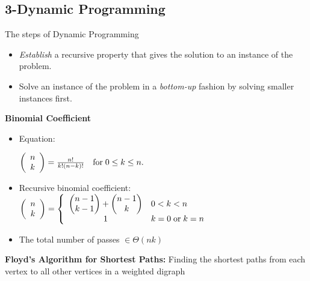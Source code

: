 \documentclass{../cheat}
\begin{document}
\begin{multicols}{3}
	
\section{3-Dynamic Programming}
	The steps of Dynamic Programming
		\begin{itemize}[nolistsep, leftmargin=1em]
		\item \textit{Establish} a recursive property that gives the solution to an instance of the problem. 
		\item Solve an instance of the problem in a \textit{bottom-up} fashion by solving smaller instances first. 
	\end{itemize}	
	
	 \textbf{Binomial Coefficient}
	 \begin{itemize}
	 	\item Equation: \\ \centerline{
			$\left( {\begin{array}{*{20}c} n \\ k \\ \end{array}} \right)=
			\frac{n!}{k!(n-k)!} \quad \text{for}\; 0 \leq k \leq n.$}
		\item Recursive binomial coefficient:\\
			$ \left( {\begin{array}{*{20}c} n \\ k \\ \end{array}} \right)=
			\left\{ \begin{array}{c l}
				\begin{pmatrix}n-1 \\ k-1 \end{pmatrix}+\begin{pmatrix}n-1 \\ k \end{pmatrix} & 0<k<n\\
				1 & k=0 \; \text{or} \; k=n\\
			\end{array} \right.$
		\item The total number of passes $\in \Theta(nk)$
	 \end{itemize}
		
	

	\textbf{Floyd's Algorithm for Shortest Paths:}
		Finding the shortest paths from each vertex to all other vertices in a weighted digraph
		

\end{multicols}
\end{document}
